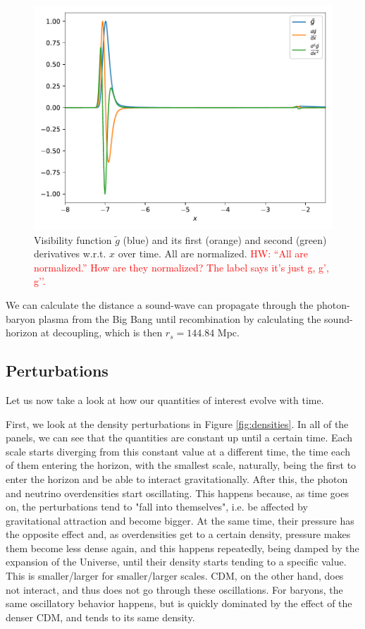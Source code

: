 \documentclass{aa}
\newcommand{\hw}[1]{\textcolor{red}{HW: #1}}
\begin{document}
\begin{figure}[ht]
    \centering
    \includegraphics[width=\hsize]{report/figures/gtilde.pdf}
    \caption{Visibility function $\tilde g$ (blue) and its first (orange) and second (green) derivatives w.r.t. $x$ over time. All are normalized. \hw{“All are normalized.” How are they normalized? The label says it’s just g, g’, g’’.}}
    \label{fig:gtilde}
\end{figure}

We can calculate the distance a sound-wave can propagate through the photon-baryon plasma from the Big Bang until recombination by calculating the sound-horizon at decoupling, which is then $r_s = 144.84$ Mpc.

\subsection{Perturbations}

Let us now take a look at how our quantities of interest evolve with time.

First, we look at the density perturbations in Figure \ref{fig:densities}. In all of the panels, we can see that the quantities are constant up until a certain time. Each scale starts diverging from this constant value at a different time, the time each of them entering the horizon, with the smallest scale, naturally, being the first to enter the horizon and be able to interact gravitationally. After this, the photon and neutrino overdensities start oscillating. This happens because, as time goes on, the perturbations tend to "fall into themselves", i.e. be affected by gravitational attraction and become bigger. At the same time, their pressure has the opposite effect and, as overdensities get to a certain density, pressure makes them become less dense again, and this happens repeatedly, being damped by the expansion of the Universe, until their density starts tending to a specific value. This is smaller/larger for smaller/larger scales. CDM, on the other hand, does not interact, and thus does not go through these oscillations. For baryons, the same oscillatory behavior happens, but is quickly dominated by the effect of the denser CDM, and tends to its same density.
\end{document}
